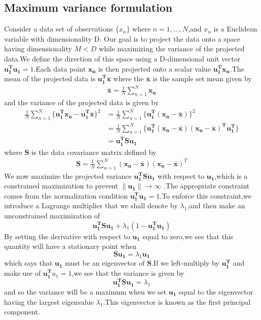 \subsection{Maximum variance formulation}
Consider a data set of observations $\{x_n\}$ where $n = 1,...,N$,and $x_n$ is a Euclidean variable with dimensionality D.
Our goal is to project the data onto a space having dimensionality $M < D$ while maximizing the variance of the projected
data.We define the direction of this space using a D-dimensional unit vector $\mathbf{u_1^T}\mathbf{u_1} = 1$.Each 
data point $\mathbf{x_n}$ is then projected onto a scalar value $\mathbf{u_1^T}\mathbf{x_n}$.The mean of the projected 
data is $\mathbf{u_1^T}\bar{\mathbf{x}}$ where the $\bar{\mathbf{x}}$ is the sample set mean given by
\begin{align}
\bar{\mathbf{x}} = \frac{1}{N}\sum_{n=1}^{N}{\mathbf{x_n}}
\end{align}                                  
and the variance of the projected data is given by
\begin{align}
\frac{1}{N}\sum_{n=1}^{N}\{\mathbf{u_1^T}\mathbf{x_n} - \mathbf{u_1^T}\bar{\mathbf{x}}\}^2 
&= \frac{1}{N}\sum_{n=1}^{N}{\{\mathbf{u_1^T}(\mathbf{x_n} - \bar{\mathbf{x}})\}^2} \\
&= \frac{1}{N}\sum_{n=1}^{N}{\{\mathbf{u_1^T(\mathbf{x_n - \bar{\mathbf{x}}})(\mathbf{x_n -\bar{x}})^T\mathbf{u_1^T} }  \}} \\
&= \mathbf{u_1^T}\mathbf{S}\mathbf{u_1}
\end{align}
where $\mathbf{S}$ is the data covariance matrix defined by
\begin{align}
\mathbf{S} = \frac{1}{N}\sum_{n=1}^{N}(\mathbf{x_n}-\bar{\mathbf{x}})(\mathbf{x_n}-\mathbf{\bar{x}})^T
\end{align}
We now maximize the projected variance $\mathbf{u_1^T}\mathbf{S}\mathbf{u_1}$ with respect to $\mathbf{u_1}$,which is a
constrained maximization to prevent $\parallel\mathbf{u_1}\parallel\rightarrow \infty$ .The appropriate constraint 
comes from the normalization condition $\mathbf{u_1^T}\mathbf{u_1}=1$.To enforce this constraint,we introduce a 
Lagrange multiplier that we shall denote by $\lambda_1$,and then make an unconstrained maximization of
\begin{equation}
\mathbf{u_1^T}\mathbf{S}\mathbf{u_1} + \lambda_1(1-\mathbf{u_1^T}\mathbf{u_1})
\end{equation}
By setting the derivative with respect to $\mathbf{u_1}$ equal to zero,we see that this quantity will have a stationary
point when
\begin{equation}
\mathbf{S}\mathbf{u_1} = \lambda_1\mathbf{u_1}
\end{equation}
which says that $\mathbf{u_1}$ must be an eigenvector of $\mathbf{S}$.If we left-multiply by $\mathbf{u_1^T}$ and make use
of $\mathbf{u_1^T}{u_1} = 1$,we see that the variance is given by
\begin{equation}
\mathbf{u_1^TSu_1} = \lambda_1
\end{equation}
and so the variance will be a maximum when we set $\mathbf{u_1}$ equal to the eigenvector having the largest 
eigenvalue $\lambda_1$.This eigenvector is known as the first principal component.


